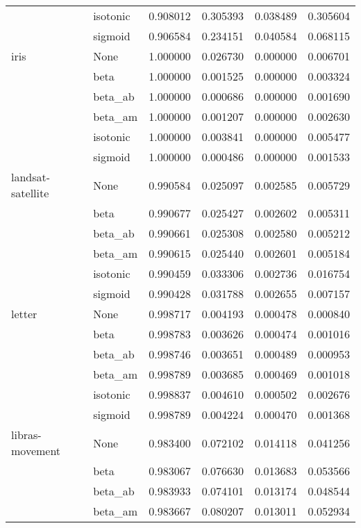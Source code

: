 \begin{tabular}{llrrrr}
        & isotonic &  0.908012 &  0.305393 &  0.038489 &  0.305604 \\
        & sigmoid &  0.906584 &  0.234151 &  0.040584 &  0.068115 \\
iris & None &  1.000000 &  0.026730 &  0.000000 &  0.006701 \\
        & beta &  1.000000 &  0.001525 &  0.000000 &  0.003324 \\
        & beta\_ab &  1.000000 &  0.000686 &  0.000000 &  0.001690 \\
        & beta\_am &  1.000000 &  0.001207 &  0.000000 &  0.002630 \\
        & isotonic &  1.000000 &  0.003841 &  0.000000 &  0.005477 \\
        & sigmoid &  1.000000 &  0.000486 &  0.000000 &  0.001533 \\
landsat-satellite & None &  0.990584 &  0.025097 &  0.002585 &  0.005729 \\
        & beta &  0.990677 &  0.025427 &  0.002602 &  0.005311 \\
        & beta\_ab &  0.990661 &  0.025308 &  0.002580 &  0.005212 \\
        & beta\_am &  0.990615 &  0.025440 &  0.002601 &  0.005184 \\
        & isotonic &  0.990459 &  0.033306 &  0.002736 &  0.016754 \\
        & sigmoid &  0.990428 &  0.031788 &  0.002655 &  0.007157 \\
letter & None &  0.998717 &  0.004193 &  0.000478 &  0.000840 \\
        & beta &  0.998783 &  0.003626 &  0.000474 &  0.001016 \\
        & beta\_ab &  0.998746 &  0.003651 &  0.000489 &  0.000953 \\
        & beta\_am &  0.998789 &  0.003685 &  0.000469 &  0.001018 \\
        & isotonic &  0.998837 &  0.004610 &  0.000502 &  0.002676 \\
        & sigmoid &  0.998789 &  0.004224 &  0.000470 &  0.001368 \\
libras-movement & None &  0.983400 &  0.072102 &  0.014118 &  0.041256 \\
        & beta &  0.983067 &  0.076630 &  0.013683 &  0.053566 \\
        & beta\_ab &  0.983933 &  0.074101 &  0.013174 &  0.048544 \\
        & beta\_am &  0.983667 &  0.080207 &  0.013011 &  0.052934 \\

\end{tabular}

